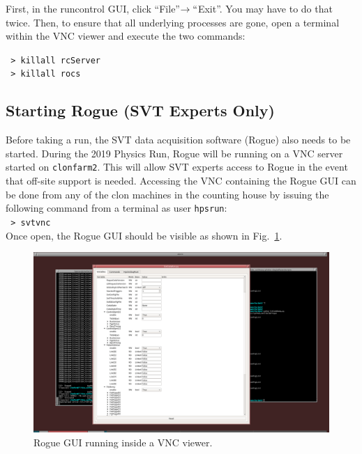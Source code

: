 \documentclass[12pt]{article}
\begin{document}
\noindent
First, in the runcontrol GUI, click ``File''$\to``$Exit''.  You may have to do
that twice. Then, to ensure that all underlying processes are gone, open a terminal within
the VNC viewer and execute the two commands:\newline
    
    \noindent
    \texttt{\hspace*{1cm} > killall rcServer} \\
    \texttt{\hspace*{1cm} > killall rocs}

\subsection{Starting Rogue (SVT Experts Only)}\label{sec:rogue}

Before taking a run, the SVT data acquisition software (Rogue) also needs to be 
started.  During the 2019 Physics Run, Rogue will be running on a VNC server 
started on \texttt{clonfarm2}. This will allow SVT experts access to Rogue
in the event that off-site support is needed. Accessing the VNC containing the
Rogue GUI can be done from any of the clon machines in the counting house
by issuing the following command from a terminal as user \texttt{hpsrun}: \\ 

    \noindent
    \texttt{\hspace*{1cm} > svtvnc} \\

\noindent
Once open, the Rogue GUI should be visible as shown in Fig.~\ref{fig:svtvnc}. 
\begin{figure}[htbp]
\begin{center}
    \includegraphics[width=.7\textwidth]{svtvnc.png}
\caption{Rogue GUI running inside a VNC viewer.}
\label{fig:svtvnc}
\end{center}
\end{figure}
\end{document}
